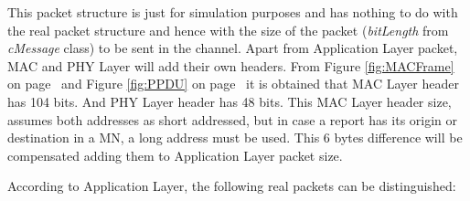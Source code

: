 This packet structure is just for simulation purposes and has nothing to do with the real packet structure and hence with the size of the 
packet (\textit{bitLength} from \textit{cMessage} class) to be sent in the channel. Apart from Application Layer packet, \ac{MAC} and 
\ac{PHY} Layer will add their own headers. From Figure \ref{fig:MACFrame} on page~\pageref{fig:MACFrame} and Figure \ref{fig:PPDU} on 
page~\pageref{fig:PPDU} it is obtained that \ac{MAC} Layer header has 104 bits. And \ac{PHY} Layer header has 48 bits. This \ac{MAC} Layer
header size, assumes both addresses as short addressed, but in case a report has its origin or destination in a \ac{MN}, a long address 
must be used. This 6 bytes difference will be compensated adding them to Application Layer packet size.

According to Application Layer, the following real packets can be distinguished:
